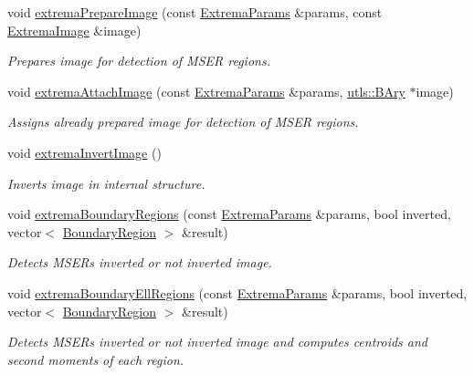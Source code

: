 \begin{CompactItemize}
void \hyperlink{namespaceextrema_49f2f15c6abeab32c237f6e72bbd616c}{extrema\-Prepare\-Image} (const \hyperlink{structextrema_1_1ExtremaParams}{Extrema\-Params} \&params, const \hyperlink{structextrema_1_1ExtremaImage}{Extrema\-Image} \&image)
\begin{CompactList}\small\item\em Prepares image for detection of MSER regions. \item\end{CompactList}\item 
void \hyperlink{namespaceextrema_87df1ae98a67706398dc9648daa26a3e}{extrema\-Attach\-Image} (const \hyperlink{structextrema_1_1ExtremaParams}{Extrema\-Params} \&params, \hyperlink{structutls_1_1Ary}{utls::BAry} $\ast$image)
\begin{CompactList}\small\item\em Assigns already prepared image for detection of MSER regions. \item\end{CompactList}\item 
void \hyperlink{namespaceextrema_e4ac7c42ad05534147aba146344cf851}{extrema\-Invert\-Image} ()
\begin{CompactList}\small\item\em Inverts image in internal structure. \item\end{CompactList}\item 
void \hyperlink{namespaceextrema_2a64706a17a785da80d6a1df11aa8229}{extrema\-Boundary\-Regions} (const \hyperlink{structextrema_1_1ExtremaParams}{Extrema\-Params} \&params, bool inverted, vector$<$ \hyperlink{structextrema_1_1BoundaryRegion}{Boundary\-Region} $>$ \&result)
\begin{CompactList}\small\item\em Detects MSERs inverted or not inverted image. \item\end{CompactList}\item 
void \hyperlink{namespaceextrema_9fa30526dfadd23b9730cb38c5e4ef88}{extrema\-Boundary\-Ell\-Regions} (const \hyperlink{structextrema_1_1ExtremaParams}{Extrema\-Params} \&params, bool inverted, vector$<$ \hyperlink{structextrema_1_1BoundaryRegion}{Boundary\-Region} $>$ \&result)
\begin{CompactList}\small\item\em Detects MSERs inverted or not inverted image and computes centroids and second moments of each region. \item\end{CompactList}\item 

\end{CompactItemize}
